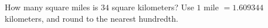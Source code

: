 How many square miles is $34$ square kilometers? Use $1$ mile $=1.609344$ kilometers, and round to the nearest hundredth.

